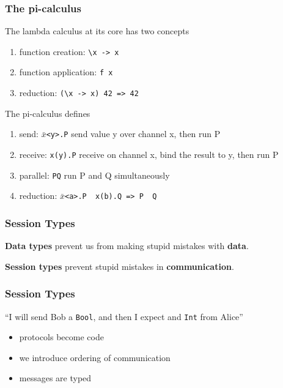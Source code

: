 \documentclass[12pt]{beamer}
\providecommand{\tightlist}{%
  \setlength{\itemsep}{0pt}\setlength{\parskip}{0pt}}
\begin{document}

\begin{frame}
\frametitle{The pi-calculus}

The lambda calculus at its core has two concepts

\begin{enumerate}
\tightlist
\item
function creation: \texttt{\textbackslash{}x\ -\textgreater{}\ x}
\item
function application: \texttt{f x}
\item
reduction: \texttt{(\textbackslash{}x\ -\textgreater{}\ x)\ 42\ =\textgreater{}\ 42} \\
\end{enumerate}

The pi-calculus defines

\begin{enumerate}
\tightlist
\item
  send: \texttt{$\bar{x}$\textless{}y\textgreater{}.P} send value y over channel
  x, then run P
\item
  receive: \texttt{x(y).P} receive on channel x, bind the result to y,
  then run P
\item
  parallel: \texttt{P\textbar{}Q} run P and Q simultaneously
\item reduction: \texttt{$\bar{x}$\textless{}a\textgreater{}.P\ \textbar{}\ x(b).Q\ =\textgreater{}\ P\ \textbar{}\ Q}
\end{enumerate}

\end{frame}

\begin{frame}
\frametitle{Session Types}

\begin{center}
    \textbf{Data types} prevent us from making stupid mistakes with \textbf{data}. \linebreak 

    \textbf{Session types} prevent stupid mistakes in \textbf{communication}.  
\end{center}

\end{frame}

\begin{frame}
\frametitle{Session Types}


“I will send Bob a \texttt{Bool}, and then I expect and \texttt{Int} from Alice”

\begin{itemize}
    \item protocols become code
    \item we introduce ordering of communication
    \item messages are typed
\end{itemize}


\end{frame}
\end{document}

